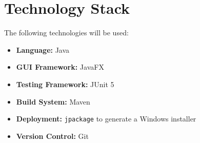 \documentclass[12pt, a4paper]{article}
\begin{document}
\section{Technology Stack}

The following technologies will be used:

\begin{itemize}
    \item \textbf{Language:} Java
    \item \textbf{GUI Framework:} JavaFX
    \item \textbf{Testing Framework:} JUnit 5
    \item \textbf{Build System:} Maven
    \item \textbf{Deployment:} \texttt{jpackage} to generate a Windows installer
    \item \textbf{Version Control:} Git
\end{itemize}

\end{document}

